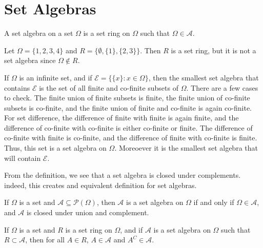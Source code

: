 \section{Set Algebras}
    \begin{definition}
        A set algebra on a set $\Omega$ is a set ring
        on $\Omega$ such that $\Omega\in\mathcal{A}$.
    \end{definition}
    \begin{example}
        Let $\Omega=\{1,2,3,4\}$ and
        $R=\{\emptyset,\{1\},\{2,3\}\}$. Then $R$
        is a set ring, but it is not a set algebra
        since $\Omega\notin{R}$.
    \end{example}
    \begin{lexample}
        If $\Omega$ is an infinite set, and if
        $\mathcal{E}=\big\{\{x\}:x\in\Omega\big\}$, then
        the smallest set algebra that contains $\mathcal{E}$
        is the set of all finite and co-finite subsets of
        $\Omega$. There are a few cases to check. The finite
        union of finite subsets is finite, the finite union of
        co-finite subsets is co-finite, and the finite union
        of finite and co-finite is again co-finite. For set
        difference, the difference of finite with finite is
        again finite, and the difference of co-finite with
        co-finite is either co-finite or finite. The
        difference of co-finite with finite is co-finite,
        and the difference of finite with co-finite is finite.
        Thus, this set is a set algebra on $\Omega$. Moreoever
        it is the smallest set algebra that will contain $\mathcal{E}$.
    \end{lexample}
    From the definition, we see that a set algebra
    is closed under complements. indeed, this creates
    and equivalent definition for set algebras.
    \begin{theorem}
        If $\Omega$ is a set and
        $\mathcal{A}\subseteq\mathcal{P}(\Omega)$,
        then $\mathcal{A}$ is a set algebra on $\Omega$
        if and only if $\Omega\in\mathcal{A}$, and
        $\mathcal{A}$ is closed under union and
        complement.
    \end{theorem}
    \begin{theorem}
        If $\Omega$ is a set and $R$ is a set ring
        on $\Omega$, and if $\mathcal{A}$ is a set
        algebra on $\Omega$ such that
        $R\subset\mathcal{A}$, then for all $A\in{R}$,
        $A\in\mathcal{A}$ and $A^{C}\in\mathcal{A}$.
    \end{theorem}
